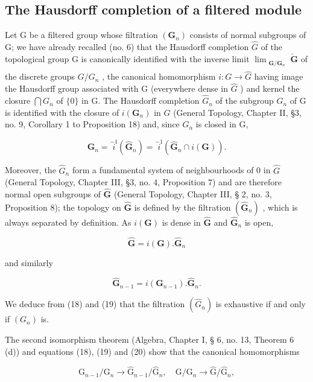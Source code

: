 \subsection{The Hausdorff completion of a filtered module}

Let G be a filtered group whose filtration \((\mathbf{G}_{n})\) consists of normal subgroups of G; we have already recalled (no. 6) that the Hausdorff completion \(\hat{G}\) of the topological group G is canonically identified with the inverse limit \(\lim_{\substack{\mathbf{G}/\mathbf{G}_{n}\\ }} \overleftarrow{\mathbf{G}}\) of the discrete groups \(G/G_{n}\) , the canonical homomorphism \(i: G \to \hat{G}\) having image the Hausdorff group associated with G (everywhere dense in \(\hat{G}\) ) and kernel the closure \(\bigcap G_{n}\) of \(\{0\}\) in G. The Hausdorff completion \(\hat{G}_{n}\) of the subgroup \(G_{n}\) of G is identified with the closure of \(i(\mathbf{G}_{n})\) in \(\hat{G}\) (General Topology, Chapter II, §3, no. 9, Corollary 1 to Proposition 18) and, since \(G_{n}\) is closed in G,


\[
\mathbf {G} _ {n} = \stackrel {- 1} {i} (\hat {\mathbf {G}} _ {n}) = \stackrel {- 1} {i} (\hat {\mathbf {G}} _ {n} \cap i (\mathbf {G})).\tag{18}
\]

Moreover, the \(\hat{G}_n\) form a fundamental system of neighbourhoods of 0 in \(\hat{G}\) (General Topology, Chapter III, §3, no. 4, Proposition 7) and are therefore normal open subgroups of \(\hat{\mathbf{G}}\) (General Topology, Chapter III, § 2, no. 3, Proposition 8); the topology on \(\hat{\mathbf{G}}\) is defined by the filtration \((\hat{\mathbf{G}}_n)\) , which is always separated by definition. As \(i(\mathbf{G})\) is dense in \(\hat{\mathbf{G}}\) and \(\hat{\mathbf{G}}_n\) is open,

\[
\hat {\mathbf {G}} = i (\mathbf {G}). \hat {\mathbf {G}} _ {n}\tag{19}
\]

and similarly

\[
\hat {\mathbf {G}} _ {n - 1} = i \left(\mathbf {G} _ {n - 1}\right). \hat {\mathbf {G}} _ {n}.\tag{20}
\]

We deduce from (18) and (19) that the filtration \((\hat{G}_n)\) is exhaustive if and only if \((G_n)\) is.

The second isomorphism theorem (Algebra, Chapter I, § 6, no. 13, Theorem 6 (d)) and equations (18), (19) and (20) show that the canonical homomorphisms

\[
\mathrm{G} _ {n - 1} / \mathrm{G} _ {n} \rightarrow \hat {\mathrm{G}} _ {n - 1} / \hat {\mathrm{G}} _ {n}, \quad \mathrm{G} / \mathrm{G} _ {n} \rightarrow \hat {\mathrm{G}} / \hat {\mathrm{G}} _ {n},\tag{21}
\]

